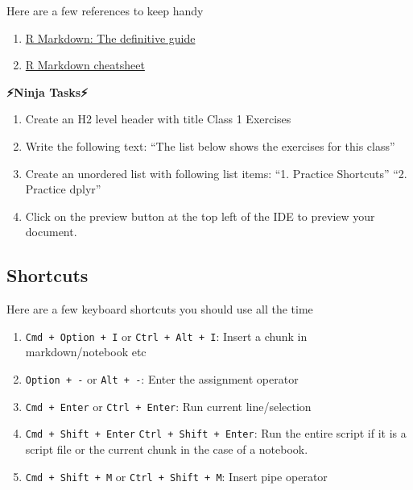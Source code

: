 \documentclass[]{article}
\providecommand{\tightlist}{%
  \setlength{\itemsep}{0pt}\setlength{\parskip}{0pt}}
\begin{document}
Here are a few references to keep handy

\begin{enumerate}
\def\labelenumi{\arabic{enumi}.}
\tightlist
\item
  \href{https://bookdown.org/yihui/rmarkdown/}{R Markdown: The
  definitive guide}
\item
  \href{https://www.rstudio.com/wp-content/uploads/2016/03/rmarkdown-cheatsheet-2.0.pdf}{R
  Markdown cheatsheet}
\end{enumerate}

\textbf{⚡Ninja Tasks⚡}

\begin{enumerate}
\def\labelenumi{\arabic{enumi}.}
\tightlist
\item
  Create an H2 level header with title Class 1 Exercises
\item
  Write the following text: ``The list below shows the exercises for
  this class''
\item
  Create an unordered list with following list items: ``1. Practice
  Shortcuts'' ``2. Practice dplyr''
\item
  Click on the preview button at the top left of the IDE to preview your
  document.
\end{enumerate}

\subsection{Shortcuts}\label{shortcuts}

Here are a few keyboard shortcuts you should use all the time

\begin{enumerate}
\def\labelenumi{\arabic{enumi}.}
\tightlist
\item
  \texttt{Cmd\ +\ Option\ +\ I} or \texttt{Ctrl\ +\ Alt\ +\ I}: Insert a
  chunk in markdown/notebook etc
\item
  \texttt{Option\ +\ -} or \texttt{Alt\ +\ -}: Enter the assignment
  operator
\item
  \texttt{Cmd\ +\ Enter} or \texttt{Ctrl\ +\ Enter}: Run current
  line/selection
\item
  \texttt{Cmd\ +\ Shift\ +\ Enter} \texttt{Ctrl\ +\ Shift\ +\ Enter}:
  Run the entire script if it is a script file or the current chunk in
  the case of a notebook.
\item
  \texttt{Cmd\ +\ Shift\ +\ M} or \texttt{Ctrl\ +\ Shift\ +\ M}: Insert
  pipe operator
\end{enumerate}
\end{document}
